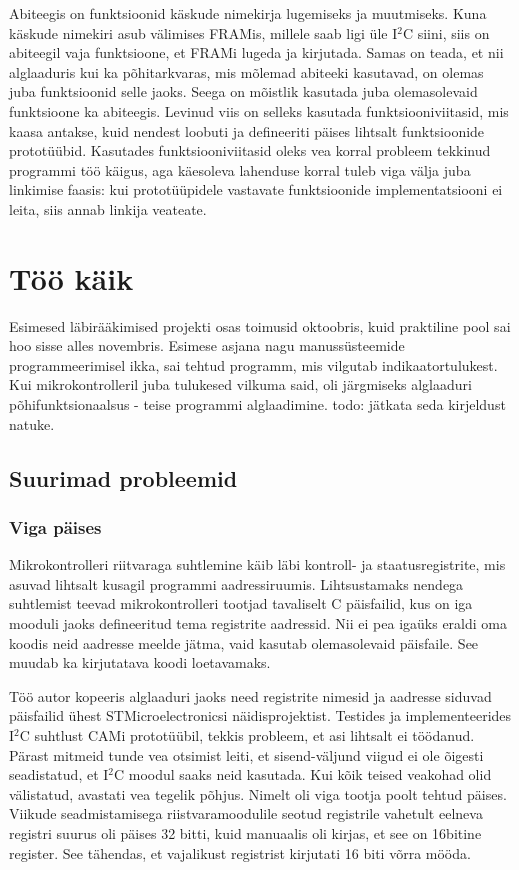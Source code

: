 \documentclass[12pt,a4paper]{article}
\newcommand{\iic}{I${}^2$C }
\begin{document}
Abiteegis on funktsioonid käskude nimekirja lugemiseks ja muutmiseks. Kuna
käskude nimekiri asub välimises FRAMis, millele saab ligi üle \iic siini, siis
on abiteegil vaja funktsioone, et FRAMi lugeda ja kirjutada. Samas on teada, et
nii alglaaduris kui ka põhitarkvaras, mis mõlemad abiteeki kasutavad, on olemas
juba funktsioonid selle jaoks. Seega on mõistlik kasutada juba olemasolevaid
funktsioone ka abiteegis. Levinud viis on selleks kasutada funktsiooniviitasid,
mis kaasa antakse, kuid nendest loobuti ja defineeriti päises lihtsalt
funktsioonide prototüübid. Kasutades funktsiooniviitasid oleks vea korral
probleem tekkinud programmi töö käigus, aga käesoleva lahenduse korral tuleb
viga välja juba linkimise faasis: kui prototüüpidele vastavate funktsioonide
implementatsiooni ei leita, siis annab linkija veateate.

\section{Töö käik}
Esimesed läbirääkimised projekti osas toimusid oktoobris, kuid praktiline pool
sai hoo sisse alles novembris. Esimese asjana nagu manussüsteemide
programmeerimisel ikka, sai tehtud programm, mis vilgutab indikaatortulukest.
Kui mikrokontrolleril juba tulukesed vilkuma said, oli järgmiseks alglaaduri
põhifunktsionaalsus - teise programmi alglaadimine. todo: jätkata seda kirjeldust
natuke.

\subsection{Suurimad probleemid}
\subsubsection{Viga päises}
Mikrokontrolleri riitvaraga suhtlemine käib läbi kontroll- ja staatusregistrite,
mis asuvad lihtsalt kusagil programmi aadressiruumis. Lihtsustamaks nendega
suhtlemist teevad mikrokontrolleri tootjad tavaliselt C päisfailid, kus on iga
mooduli jaoks defineeritud tema registrite aadressid. Nii ei pea igaüks eraldi
oma koodis neid aadresse meelde jätma, vaid kasutab olemasolevaid päisfaile. See
muudab ka kirjutatava koodi loetavamaks.

Töö autor kopeeris alglaaduri jaoks need registrite nimesid ja aadresse siduvad
päisfailid ühest STMicroelectronicsi näidisprojektist. Testides ja
implementeerides \iic suhtlust CAMi prototüübil, tekkis probleem, et asi
lihtsalt ei töödanud. Pärast mitmeid tunde vea otsimist leiti, et
sisend-väljund viigud ei ole õigesti seadistatud, et \iic moodul saaks neid
kasutada. Kui kõik teised veakohad olid välistatud, avastati vea tegelik põhjus.
Nimelt oli viga tootja poolt tehtud päises. Viikude seadmistamisega
riistvaramoodulile seotud registrile vahetult eelneva registri suurus oli päises
32 bitti, kuid manuaalis oli kirjas, et see on 16bitine register. See tähendas,
et vajalikust registrist kirjutati 16 biti võrra mööda. 
\end{document}
